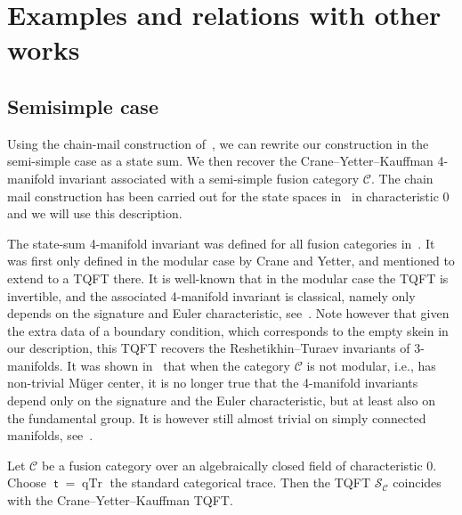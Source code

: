 \documentclass[pdftex]{sigma}
\numberwithin{equation}{section}
\numberwithin{theorem}{section}
\numberwithin{proposition}{section}
\numberwithin{definition}{section}
\numberwithin{lemma}{section}
\numberwithin{corollary}{section}
\numberwithin{remark}{section}
\numberwithin{example}{section}
\newcommand{\cat}{\mathcal{C}}
\newcommand{\mt}{{\operatorname{\mathsf{t}}}}
\newcommand{\TSkein}{{\mathscr{S}}}
\begin{document}
\section{Examples and relations with other works}\label{S:Examples}
\subsection{Semisimple case}\label{SS:ExSS} Using the chain-mail construction of~\cite{Roberts}, we can rewrite our construction in the semi-simple case as a state sum. We then recover the Crane--Yetter--Kauffman 4-manifold invariant associated with a semi-simple fusion category $\cat$. The chain mail construction has been carried out for the state spaces in~\cite{Tham21} in characteristic 0 and we will use this description.

The state-sum 4-manifold invariant was defined for all fusion categories in~\cite{CYK}. It was first only defined in the modular case by Crane and Yetter, and mentioned to extend to a TQFT there. It is well-known that in the modular case the TQFT is invertible, and the associated 4-manifold invariant is classical, namely only depends on the signature and Euler characteristic, see~\cite[Proposition 6.2]{CYK}. Note however that given the extra data of a boundary condition, which corresponds to the empty skein in our description, this TQFT recovers the Reshetikhin--Turaev invariants of 3-manifolds. It was shown in~\cite{BB18} that when the category $\cat$ is not modular, i.e., has non-trivial M\"uger center, it is no longer true that the 4-manifold invariants depend only on the signature and the Euler characteristic, but at least also on the fundamental group. It is however still almost trivial on simply connected manifolds, see~\cite{BB18}.
\begin{theorem} Let $\cat$ be a fusion category over an algebraically closed field of characteristic $0$. Choose $\mt=\operatorname{qTr}$ the standard categorical trace. Then the TQFT $\TSkein_\cat$ coincides with the Crane--Yetter--Kauffman TQFT.
\end{theorem}
\end{document}
